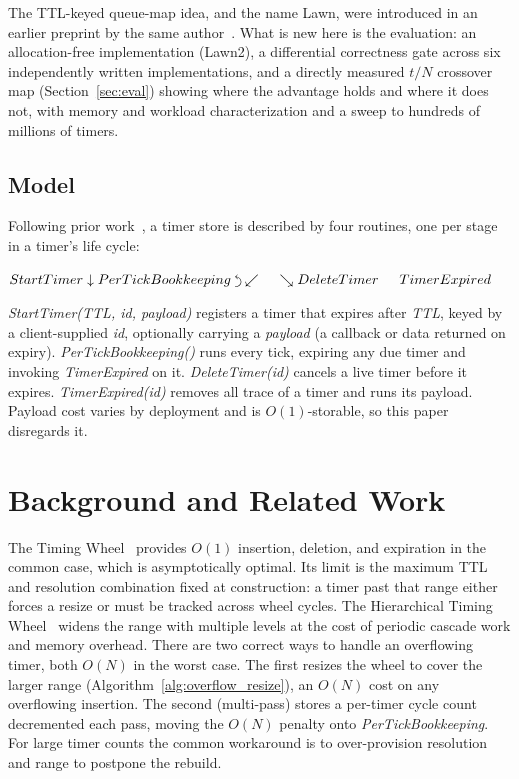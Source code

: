 \documentclass[conference]{IEEEtran}
\newcommand{\backtrackarrow}{\rotatebox[origin=c]{-90}{$\curvearrowleft$}}
\begin{document}
The TTL-keyed queue-map idea, and the name Lawn, were introduced in an earlier preprint by the same author~\cite{LawnArxiv}. What is new here is the evaluation: an allocation-free implementation (Lawn2), a differential correctness gate across six independently written implementations, and a directly measured $t/N$ crossover map (Section~\ref{sec:eval}) showing where the advantage holds and where it does not, with memory and workload characterization and a sweep to hundreds of millions of timers.

\subsection{Model}
Following prior work~\cite{TW, CQ, EMP}, a timer store is described by four routines, one per stage in a timer's life cycle:

\begin{center}
	$
	StartTimer \linebreak
	\downarrow \linebreak
	PerTickBookkeeping \hspace{1mm} \backtrackarrow \linebreak
	\swarrow  \hspace{15pt}  \searrow \linebreak
	DeleteTimer \hspace{15pt} TimerExpired
	$
\end{center}

\textit{StartTimer(TTL, id, payload)} registers a timer that expires after \textit{TTL}, keyed by a client-supplied \textit{id}, optionally carrying a \textit{payload} (a callback or data returned on expiry). \textit{PerTickBookkeeping()} runs every tick, expiring any due timer and invoking \textit{TimerExpired} on it. \textit{DeleteTimer(id)} cancels a live timer before it expires. \textit{TimerExpired(id)} removes all trace of a timer and runs its payload. Payload cost varies by deployment and is $O(1)$-storable, so this paper disregards it.

\section{Background and Related Work}
The Timing Wheel~\cite{TW87} provides $O(1)$ insertion, deletion, and expiration in the common case, which is asymptotically optimal. Its limit is the maximum TTL and resolution combination fixed at construction: a timer past that range either forces a resize or must be tracked across wheel cycles. The Hierarchical Timing Wheel~\cite{TW} widens the range with multiple levels at the cost of periodic cascade work and memory overhead. There are two correct ways to handle an overflowing timer, both $O(N)$ in the worst case. The first resizes the wheel to cover the larger range (Algorithm~\ref{alg:overflow_resize}), an $O(N)$ cost on any overflowing insertion. The second (multi-pass) stores a per-timer cycle count decremented each pass, moving the $O(N)$ penalty onto \textit{PerTickBookkeeping}. For large timer counts the common workaround is to over-provision resolution and range to postpone the rebuild.
\end{document}
